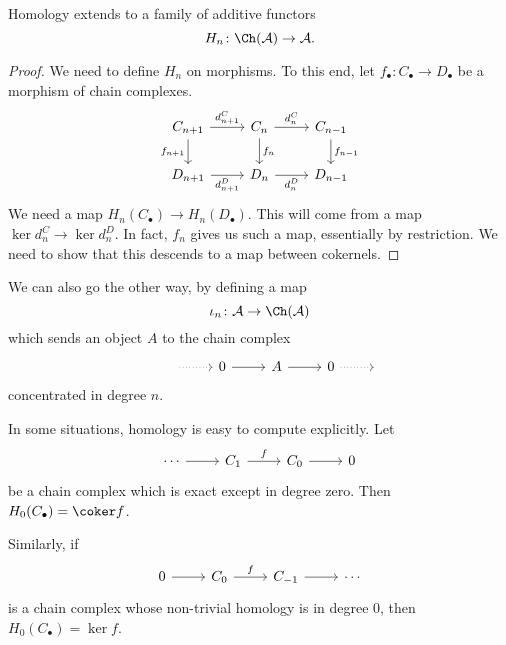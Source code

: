 \documentclass[main.tex]{subfiles}
\begin{document}
\begin{proposition}
  Homology extends to a family of additive functors
  \begin{equation*}
    H_{n}\colon \Ch(\mathcal{A}) \to \mathcal{A}.
  \end{equation*}
\end{proposition}
\begin{proof}
  We need to define $H_{n}$ on morphisms. To this end, let $f_{\bullet}\colon C_{\bullet} \to D_{\bullet}$ be a morphism of chain complexes.
  \begin{equation*}
    \begin{tikzcd}
      C_{n+1}
      \arrow[r, "d^{C}_{n+1}"]
      \arrow[d, swap, "f_{n+1}"]
      & C_{n}
      \arrow[r, "d^{C}_{n}"]
      \arrow[d, "f_{n}"]
      & C_{n-1}
      \arrow[d, "f_{n-1}"]
      \\
      D_{n+1}
      \arrow[r, swap, "d^{D}_{n+1}"]
      & D_{n}
      \arrow[r, swap, "d^{D}_{n}"]
      & D_{n-1}
    \end{tikzcd}
  \end{equation*}
  We need a map $H_{n}(C_{\bullet}) \to H_{n}(D_{\bullet})$. This will come from a map $\ker d^{C}_{n} \to \ker d^{D}_{n}$. In fact, $f_{n}$ gives us such a map, essentially by restriction. We need to show that this descends to a map between cokernels.
\end{proof}

We can also go the other way, by defining a map
\begin{equation*}
  \iota_{n}\colon \mathcal{A} \to \Ch(\mathcal{A})
\end{equation*}
which sends an object $A$ to the chain complex
\begin{equation*}
  \begin{tikzcd}
    &{\ }
    \arrow[r, dotted]
    & 0
    \arrow[r]
    & A
    \arrow[r]
    & 0
    \arrow[r, dotted]
    &{\ }
  \end{tikzcd}
\end{equation*}
concentrated in degree $n$.

\begin{example}
  \label{eg:compute_homology_in_trivial_situation}
  In some situations, homology is easy to compute explicitly. Let
  \begin{equation*}
    \begin{tikzcd}
      \cdots
      \arrow[r]
      & C_{1}
      \arrow[r, "f"]
      & C_{0}
      \arrow[r]
      & 0
    \end{tikzcd}
  \end{equation*}
  be a chain complex which is exact except in degree zero. Then $H_{0}(C_{\bullet}) = \coker f$.

  Similarly, if
  \begin{equation*}
    \begin{tikzcd}
      0
      \arrow[r]
      & C_{0}
      \arrow[r, "f"]
      & C_{-1}
      \arrow[r]
      & \cdots
    \end{tikzcd}
  \end{equation*}
  is a chain complex whose non-trivial homology is in degree $0$, then $H_{0}(C_{\bullet}) = \ker f$.
\end{example}
\end{document}
